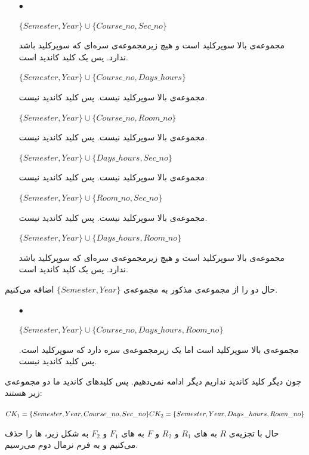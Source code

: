\documentclass{article}
\begin{document}
\begin{itemize}
    \item [$\bullet$]
\begin{latin}
$
\{Semester, Year\}\cup\{Course\_no, Sec\_no\}
$
\end{latin}
مجموعه‌ی بالا سوپرکلید است و هیچ زیرمجموعه‌ی سره‌ای که سوپرکلید باشد ندارد. پس یک کلید کاندید است.
\begin{latin}
$
\{Semester, Year\}\cup\{Course\_no, Days\_hours\}
$
\end{latin}
مجموعه‌ی بالا سوپرکلید نیست. پس کلید کاندید نیست.
\begin{latin}
$
\{Semester, Year\}\cup\{Course\_no, Room\_no\}
$
\end{latin}
مجموعه‌ی بالا سوپرکلید نیست. پس کلید کاندید نیست.

\begin{latin}
$
\{Semester, Year\}\cup\{Days\_hours, Sec\_no\}
$
\end{latin}
مجموعه‌ی بالا سوپرکلید نیست. پس کلید کاندید نیست.

\begin{latin}
$
\{Semester, Year\}\cup\{Room\_no, Sec\_no\}
$
\end{latin}
مجموعه‌ی بالا سوپرکلید نیست. پس کلید کاندید نیست.
\begin{latin}
$
\{Semester, Year\}\cup\{Days\_hours, Room\_no\}
$
\end{latin}
مجموعه‌ی بالا سوپرکلید است و هیچ زیرمجموعه‌ی سره‌ای که سوپرکلید باشد ندارد. پس یک کلید کاندید است.
\end{itemize}

حال دو  را از مجموعه‌ی مذکور به مجموعه‌ی
$
\{Semester, Year\}
$
اضافه می‌کنیم.
\begin{itemize}
    \item [$\bullet$]
\begin{latin}
$
\{Semester, Year\}\cup\{Course\_no, Days\_hours, Room\_no\}
$
\end{latin}
مجموعه‌ی بالا سوپرکلید است اما یک زیرمجموعه‌ی سره دارد که سوپرکلید است. پس کلید کاندید نیست.
\end{itemize}
 چون دیگر کلید کاندید نداریم دیگر ادامه نمی‌دهیم. پس کلیدهای کاندید ما دو مجموعه‌ی زیر هستند:
\begin{latin}
$
\\CK_{1}=\{Semester, Year, Course\_no, Sec\_no\}\\
CK_{2}=\{Semester, Year, Days\_hours, Room\_no\}
$
\end{latin}
حال با تجزیه‌ی $R$ به های 
$R_{1}$ و $R_{2}$ 
و $F$ به های 
$F_{1}$ و $F_{2}$ 
به شکل زیر، ها را حذف می‌کنیم و به فرم نرمال دوم می‌رسیم.
\end{document}
